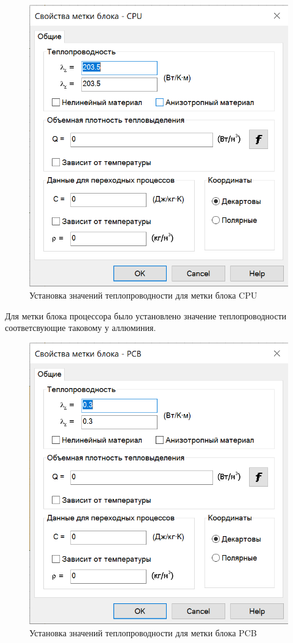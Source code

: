 \begin{figure}[h]
  \centering
  \includegraphics[scale = 0.40]{images2/Elcut_cpu_lambda.png}
  \caption{ Установка значений теплопроводности для метки блока CPU }
\end{figure}

Для метки блока процессора было установлено значение теплопроводности
соответсвующие таковому у аллюминия.

\begin{figure}[h]
  \centering
  \includegraphics[scale = 0.40]{images2/Elcut_pcb_lambda.png}
  \caption{ Установка значений теплопроводности для метки блока PCB }
\end{figure}

